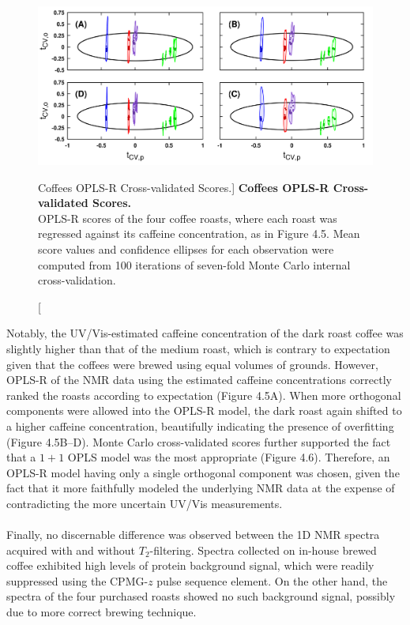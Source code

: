 \begin{figure}[H]
\includegraphics[width=6.5in]{figs/apps/06-oplsr-tcv.png}
\caption
      [Coffees OPLS-R Cross-validated Scores.]{
  {\bf Coffees OPLS-R Cross-validated Scores.}
  \\
  OPLS-R scores of the four coffee roasts, where each roast was regressed
  against its caffeine concentration, as in Figure 4.5. Mean score values
  and confidence ellipses for each observation were computed from 100
  iterations of seven-fold Monte Carlo internal cross-validation.
}
\end{figure}

\begin{doublespace}
Notably, the UV/Vis-estimated caffeine concentration of the dark roast coffee
was slightly higher than that of the medium roast, which is contrary to
expectation given that the coffees were brewed using equal volumes of
grounds. However, OPLS-R of the NMR data using the estimated caffeine
concentrations correctly ranked the roasts according to expectation
(Figure 4.5A). When more orthogonal components were allowed into the OPLS-R
model, the dark roast again shifted to a higher caffeine concentration,
beautifully indicating the presence of overfitting (Figure 4.5B--D).
Monte Carlo cross-validated scores further supported the fact that a $1+1$
OPLS model was the most appropriate (Figure 4.6). Therefore, an OPLS-R model
having only a single orthogonal component was chosen, given the fact that it
more faithfully modeled the underlying NMR data at the expense of
contradicting the more uncertain UV/Vis measurements.
\\\\
Finally, no discernable difference was observed between the 1D \hnmr{} NMR
spectra acquired with and without $T_2$-filtering. Spectra collected on
in-house brewed coffee exhibited high levels of protein background signal,
which were readily suppressed using the CPMG-$z$ pulse sequence element. On
the other hand, the spectra of the four purchased roasts showed no such
background signal, possibly due to more correct brewing technique.
\end{doublespace}

